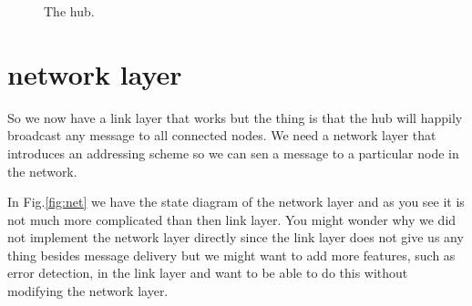 \documentclass[a4paper,11pt]{article}
\begin{document}
\begin{figure}
\centering  
{}
\caption{The hub.}
\label{fig:hub}
\end{figure}


\section{network layer}

So we now have a link layer that works but the thing is that the hub
will happily broadcast any message to all connected nodes. We need a
network layer that introduces an addressing scheme so we can sen a
message to a particular node in the network.

In Fig.\ref{fig:net} we have the state diagram of the network layer
and as you see it is not much more complicated than then link
layer. You might wonder why we did not implement the network layer
directly since the link layer does not give us any thing besides
message delivery but we might want to add more features, such as error
detection, in the link layer and want to be able to do this without
modifying the network layer.
\end{document}
